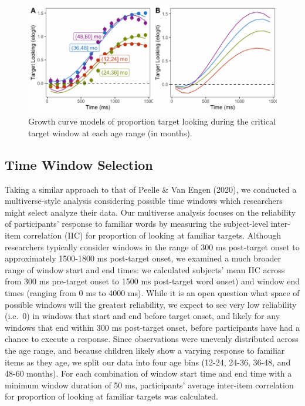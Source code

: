 \documentclass[10pt, letterpaper]{article}
\newenvironment{CodeChunk}{}{}
\begin{document}
\begin{CodeChunk}
\begin{figure}[H]

{\centering \includegraphics{figs/age_gca-1} 

}

\caption[Growth curve models of proportion target looking during the critical target window at each age range (in months)]{Growth curve models of proportion target looking during the critical target window at each age range (in months).}\label{fig:age_gca}
\end{figure}
\end{CodeChunk}

\hypertarget{time-window-selection}{%
\subsection{Time Window Selection}\label{time-window-selection}}

Taking a similar approach to that of Peelle \& Van Engen (2020), we
conducted a multiverse-style analysis considering possible time windows
which researchers might select analyze their data. Our multiverse
analysis focuses on the reliability of participants' response to
familiar words by measuring the subject-level inter-item correlation
(IIC) for proportion of looking at familiar targets. Although
researchers typically consider windows in the range of 300 ms
post-target onset to approximately 1500-1800 ms post-target onset, we
examined a much broader range of window start and end times: we
calculated subjects' mean IIC across from 300 ms pre-target onset to
1500 ms post-target word onset) and window end times (ranging from 0 ms
to 4000 ms). While it is an open question what space of possible windows
will the greatest reliability, we expect to see very low reliability
(i.e.~0) in windows that start and end before target onset, and likely
for any windows that end within 300 ms post-target onset, before
participants have had a chance to execute a response. Since observations
were unevenly distributed across the age range, and because children
likely show a varying response to familiar items as they age, we split
our data into four age bins (12-24, 24-36, 36-48, and 48-60 months). For
each combination of window start time and end time with a minimum window
duration of 50 ms, participants' average inter-item correlation for
proportion of looking at familiar targets was calculated.
\end{document}
